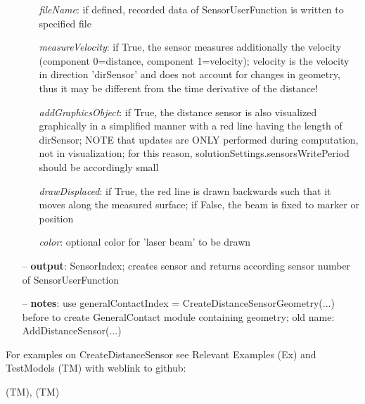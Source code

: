 \begin{itemize}[leftmargin=0.7cm]
\begin{itemize}[leftmargin=1.2cm]
\item[]{\it fileName}: if defined, recorded data of SensorUserFunction is written to specified file
\item[]{\it measureVelocity}: if True, the sensor measures additionally the velocity (component 0=distance, component 1=velocity); velocity is the velocity in direction 'dirSensor' and does not account for changes in geometry, thus it may be different from the time derivative of the distance!
\item[]{\it addGraphicsObject}: if True, the distance sensor is also visualized graphically in a simplified manner with a red line having the length of dirSensor; NOTE that updates are ONLY performed during computation, not in visualization; for this reason, solutionSettings.sensorsWritePeriod should be accordingly small
\item[]{\it drawDisplaced}: if True, the red line is drawn backwards such that it moves along the measured surface; if False, the beam is fixed to marker or position
\item[]{\it color}: optional color for 'laser beam' to be drawn
\end{itemize}
\item[--]
{\bf output}: SensorIndex; creates sensor and returns according sensor number of SensorUserFunction
\item[--]
{\bf notes}: use generalContactIndex = CreateDistanceSensorGeometry(...) before to create GeneralContact module containing geometry; old name: AddDistanceSensor(...)
\vspace{12pt}\end{itemize}
%

%
\noindent For examples on CreateDistanceSensor see Relevant Examples (Ex) and TestModels (TM) with weblink to github:
\bi
 \item \footnotesize {} (TM), 
 (TM)
\ei

